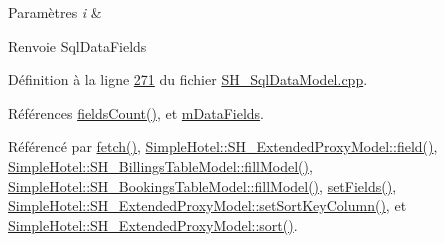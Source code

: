 \begin{DoxyParams}{Paramètres}
{\em i} & \\
\hline
\end{DoxyParams}
\begin{DoxyReturn}{Renvoie}
Sql\-Data\-Fields 
\end{DoxyReturn}


Définition à la ligne \hyperlink{SH__SqlDataModel_8cpp_source_l00271}{271} du fichier \hyperlink{SH__SqlDataModel_8cpp_source}{S\-H\-\_\-\-Sql\-Data\-Model.\-cpp}.



Références \hyperlink{classSimpleHotel_1_1SH__SqlDataModel_a17632bfd3246d95554d3642089c3828b}{fields\-Count()}, et \hyperlink{classSimpleHotel_1_1SH__SqlDataModel_aa583366a8960adea9a0719a63fa03a24}{m\-Data\-Fields}.



Référencé par \hyperlink{classSimpleHotel_1_1SH__SqlDataModel_ab8b74a08f668025c11c5446d4e4b469b}{fetch()}, \hyperlink{classSimpleHotel_1_1SH__ExtendedProxyModel_ac091225266a35c84307835f40d9b6e9b}{Simple\-Hotel\-::\-S\-H\-\_\-\-Extended\-Proxy\-Model\-::field()}, \hyperlink{classSimpleHotel_1_1SH__BillingsTableModel_a1c7a4b063550fbf1941a7c1fcc4868b7}{Simple\-Hotel\-::\-S\-H\-\_\-\-Billings\-Table\-Model\-::fill\-Model()}, \hyperlink{classSimpleHotel_1_1SH__BookingsTableModel_aeea8a4c01331189cc39c6f6a93488f15}{Simple\-Hotel\-::\-S\-H\-\_\-\-Bookings\-Table\-Model\-::fill\-Model()}, \hyperlink{classSimpleHotel_1_1SH__SqlDataModel_a70bdb5d69f0709cdea2c17f257089f91}{set\-Fields()}, \hyperlink{classSimpleHotel_1_1SH__ExtendedProxyModel_a901f2d931216126e6769482d91f02fa0}{Simple\-Hotel\-::\-S\-H\-\_\-\-Extended\-Proxy\-Model\-::set\-Sort\-Key\-Column()}, et \hyperlink{classSimpleHotel_1_1SH__ExtendedProxyModel_a5d7686a9fae295e0662057b8450c8a8d}{Simple\-Hotel\-::\-S\-H\-\_\-\-Extended\-Proxy\-Model\-::sort()}.


